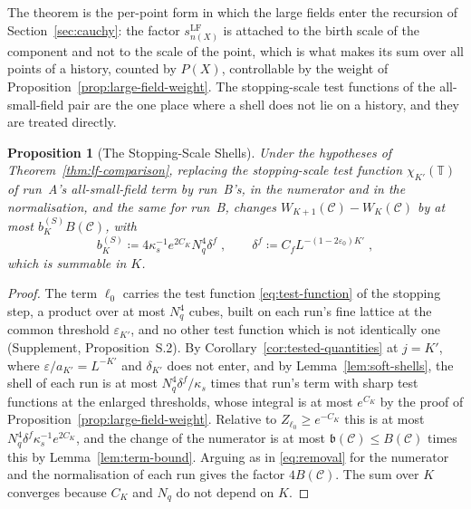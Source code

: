 \documentclass[11pt]{preprint}
\numberwithin{equation}{section}
\newtheorem{proposition}[theorem]{Proposition}
\theoremstyle{definition}
\theoremstyle{remark}
\theoremstyle{plain}
\begin{document}
The theorem is the per-point form in which the large fields enter the recursion of Section~\ref{sec:cauchy}: the factor $s^{\mathrm{LF}}_{n(X)}$ is attached to the birth scale of the component and not to the scale of the point, which is what makes its sum over all points of a history, counted by $P(X)$, controllable by the weight of Proposition~\ref{prop:large-field-weight}. The stopping-scale test functions of the all-small-field pair are the one place where a shell does not lie on a history, and they are treated directly.

\begin{proposition}[The Stopping-Scale Shells]\label{prop:stopping-shells}
Under the hypotheses of Theorem~\ref{thm:lf-comparison}, replacing the stopping-scale test function $\chi_{K'}(\mathbb T)$ of run~A's all-small-field term by run~B's, in the numerator and in the normalisation, and the same for run~B, changes $W_{K+1}(\mathcal C) - W_K(\mathcal C)$ by at most $b^{(S)}_KB(\mathcal C)$, with
\begin{equation}\label{eq:stopping-shells}
    b^{(S)}_K \coloneqq 4\kappa_s^{-1}e^{2C_K}N_q^4\delta^f\;,
    \qquad
    \delta^f \coloneqq C_fL^{-(1-2\varepsilon_0)K'}\;,
\end{equation}
which is summable in $K$.
\end{proposition}

\begin{proof}
The term $\ell_0$ carries the test function \eqref{eq:test-function} of the stopping step, a product over at most $N_q^4$ cubes, built on each run's fine lattice at the common threshold $\varepsilon_{K'}$, and no other test function which is not identically one (Supplement, Proposition~S.2). By Corollary~\ref{cor:tested-quantities} at $j = K'$, where $\varepsilon/a_{K'} = L^{-K'}$ and $\delta_{K'}$ does not enter, and by Lemma~\ref{lem:soft-shells}, the shell of each run is at most $N_q^4\delta^f/\kappa_s$ times that run's term with sharp test functions at the enlarged thresholds, whose integral is at most $e^{C_K}$ by the proof of Proposition~\ref{prop:large-field-weight}. Relative to $Z_{\ell_0} \geq e^{-C_K}$ this is at most $N_q^4\delta^f\kappa_s^{-1}e^{2C_K}$, and the change of the numerator is at most $\mathfrak b(\mathcal C) \leq B(\mathcal C)$ times this by Lemma~\ref{lem:term-bound}. Arguing as in \eqref{eq:removal} for the numerator and the normalisation of each run gives the factor $4B(\mathcal C)$. The sum over $K$ converges because $C_K$ and $N_q$ do not depend on $K$.
\end{proof}
\end{document}
